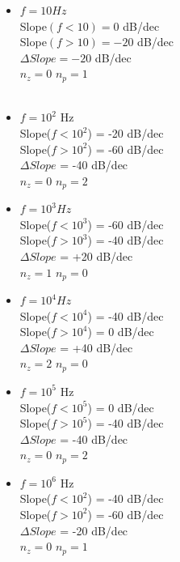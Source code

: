 \begin{itemize}
\\
\item $f = 10 Hz $
\\Slope$(f<10) = 0$ dB/dec
\\Slope$(f>10) = -20$ dB/dec 
\\ $ \Delta Slope = -20$ dB/dec
\\ $n_{z} = 0$   $n_{p} = 1 $
\\
\\
\item $f = 10^{2}$ Hz 
\\Slope($f<10^{2}$) = -20 dB/dec
\\Slope($f>10^{2}$) = -60 dB/dec 
\\ $ \Delta Slope$ = -40 dB/dec
\\ $n_{z} = 0$ $n_{p} = 2 $
\\ 
\item $f = 10^{3} Hz $
\\Slope($f<10^{3}$) = -60 dB/dec
\\Slope($f>10^{3}$) = -40 dB/dec 
\\ $ \Delta Slope$ = +20 dB/dec
\\ $n_{z} = 1$   $n_{p} = 0 $
\\
\item $f = 10^{4} Hz$ 
\\Slope($f < 10^{4}$) = -40 dB/dec
\\Slope($f>10^{4}$) = 0 dB/dec 
\\ $ \Delta Slope$ = +40 dB/dec
\\ $n_{z} = 2$   $n_{p} = 0 $
\\
\item $f = 10^{5}$ Hz 
\\Slope($f<10^{5}$) = 0 dB/dec
\\Slope($f>10^{5}$) = -40 dB/dec 
\\ $ \Delta Slope$ = -40 dB/dec
\\ $n_{z} = 0$   $n_{p} = 2 $
\\
\item $f = 10^{6}$ Hz 
\\Slope($f<10^{2}$) = -40 dB/dec
\\Slope($f>10^{2}$) = -60 dB/dec 
\\ $ \Delta Slope$ = -20 dB/dec
\\ $n_{z} = 0$   $n_{p} = 1 $
\\
\\ 
\\
\end{itemize}
